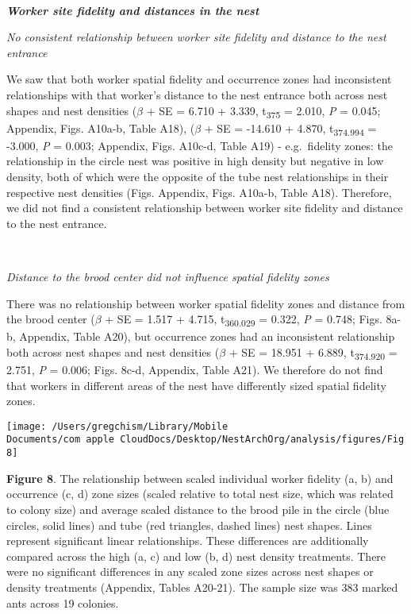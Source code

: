 \documentclass[3p]{elsarticle} %
\begin{document}
~

\textbf{\emph{Worker site fidelity and distances in the nest}}

\emph{No consistent relationship between worker site fidelity and
distance to the nest entrance}

We saw that both worker spatial fidelity and occurrence zones had
inconsistent relationships with that worker's distance to the nest
entrance both across nest shapes and nest densities (\(\beta\) + SE =
6.710 + 3.339, t\textsubscript{375} = 2.010, \emph{P} = 0.045; Appendix,
Figs. A10a-b, Table A18), (\(\beta\) + SE = -14.610 + 4.870,
t\textsubscript{374.994} = -3.000, \emph{P} = 0.003; Appendix, Figs.
A10c-d, Table A19) - e.g.~fidelity zones: the relationship in the circle
nest was positive in high density but negative in low density, both of
which were the opposite of the tube nest relationships in their
respective nest densities (Figs. Appendix, Figs. A10a-b, Table A18).
Therefore, we did not find a consistent relationship between worker site
fidelity and distance to the nest entrance.

~

\emph{Distance to the brood center did not influence spatial fidelity
zones}

There was no relationship between worker spatial fidelity zones and
distance from the brood center (\(\beta\) + SE = 1.517 + 4.715,
t\textsubscript{360.029} = 0.322, \emph{P} = 0.748; Figs. 8a-b,
Appendix, Table A20), but occurrence zones had an inconsistent
relationship both across nest shapes and nest densities (\(\beta\) + SE
= 18.951 + 6.889, t\textsubscript{374.920} = 2.751, \emph{P} = 0.006;
Figs. 8c-d, Appendix, Table A21). We therefore do not find that workers
in different areas of the nest have differently sized spatial fidelity
zones.

\begin{flushleft}\texttt{[image: /Users/gregchism/Library/Mobile Documents/com~apple~CloudDocs/Desktop/NestArchOrg/analysis/figures/Fig8]} \end{flushleft}

\textbf{Figure 8}. The relationship between scaled individual worker
fidelity (a, b) and occurrence (c, d) zone sizes (scaled relative to
total nest size, which was related to colony size) and average scaled
distance to the brood pile in the circle (blue circles, solid lines) and
tube (red triangles, dashed lines) nest shapes. Lines represent
significant linear relationships. These differences are additionally
compared across the high (a, c) and low (b, d) nest density treatments.
There were no significant differences in any scaled zone sizes across
nest shapes or density treatments (Appendix, Tables A20-21). The sample
size was 383 marked ants across 19 colonies.
\end{document}
